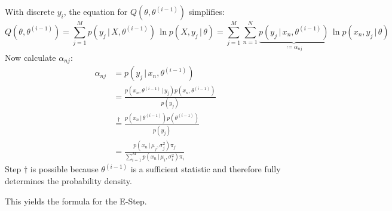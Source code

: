 \documentclass[a4paper, 11pt, accentcolor = tud3b]{tudreport}
\newcommand{\given}{\ensuremath{\,\vert\,}}
\begin{document}
						With discrete \(y_i\), the equation for \(Q(\theta, \theta^{(i - 1)})\) simplifies:
						\begin{equation}
							Q(\theta, \theta^{(i - 1)}) = \sum_{j = 1}^{M} p(y_j \given X, \theta^{(i - 1)}) \, \ln p(X, y_j \given \theta) = \sum_{j = 1}^{M} \sum_{n = 1}^{N} \underbrace{p(y_j \given x_n, \theta^{(i - 1)})}_{\coloneqq \alpha_{nj}} \, \ln p(x_n, y_j \given \theta)
						\end{equation}
						Now calculate \( \alpha_{nj} \):
						\begin{align}
							\alpha_{nj} &= p(y_j \given x_n, \theta^{(i - 1)}) \\
								&= \frac{p(x_n, \theta^{(i - 1)} \given y_j) p(x_n, \theta^{(i - 1)})}{p(y_j)} \\
								&\overset{\dagger}{=} \frac{p(x_n \given \theta^{(i - 1)}) p(\theta^{(i - 1)})}{p(y_j)} \\
								&= \frac{p(x_n \given \mu_j, \sigma_j^2) \pi_j}{\sum_{i = 1}^{M} p(x_n \given \mu_i, \sigma_i^2) \pi_i}
						\end{align}
						Step \(\dagger\) is possible because \( \theta^{(i - 1)} \) is a sufficient statistic and therefore fully determines the probability density.

						This yields the formula for the E-Step.
\end{document}

